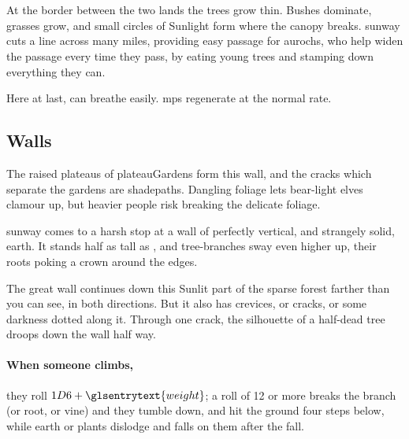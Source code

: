 \section{}
\label{sunway}

At the border between the two lands the trees grow thin.
Bushes dominate, grasses grow, and small circles of Sunlight form where the canopy breaks.
\Gls{sunway} cuts a line across many miles, providing easy passage for aurochs, who help widen the passage every time they pass, by eating young trees and stamping down everything they can.

Here at last,  can breathe easily.
\Glspl{mp} regenerate at the normal rate.


\begin{multicols}{2}
\subsection{ Walls}

The raised plateaus of \gls{plateauGardens} form this wall, and the cracks which separate the gardens are \gls{shadepaths}.
Dangling foliage lets bear-light elves clamour up, but heavier people risk breaking the delicate foliage.

\begin{boxtext}
  \Gls{sunway} comes to a harsh stop at a wall of perfectly vertical, and strangely solid, earth.
  It stands half as tall as , and tree-branches sway even higher up, their roots poking a crown around the edges.

  The great wall continues down this Sunlit part of the sparse forest farther than you can see, in both directions.
  But it also has crevices, or cracks, or some darkness dotted along it.
  Through one crack, the silhouette of a half-dead tree droops down the wall half way.
\end{boxtext}

\paragraph{When someone climbs,}
they roll $1D6 + \glsentrytext{weight}$; a roll of 12 or more breaks the branch (or root, or vine) and they tumble down, and hit the ground four \glspl{step} below, while earth or plants dislodge and falls on them after the fall.


\end{multicols}

